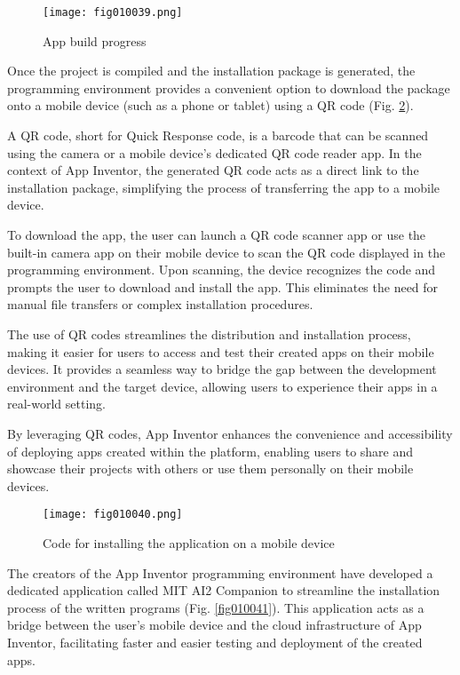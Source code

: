 \begin{figure}[H]
   \centering
   \texttt{[image: fig010039.png]}
   \caption{App build progress}
\label{fig010039}
\end{figure}

Once the project is compiled and the installation package is generated, the programming environment provides a convenient option to download the package onto a mobile device (such as a phone or tablet) using a QR code (Fig. \ref{fig010040}).

A QR code, short for Quick Response code, is a barcode that can be scanned using the camera or a mobile device's dedicated QR code reader app. In the context of App Inventor, the generated QR code acts as a direct link to the installation package, simplifying the process of transferring the app to a mobile device.

To download the app, the user can launch a QR code scanner app or use the built-in camera app on their mobile device to scan the QR code displayed in the programming environment. Upon scanning, the device recognizes the code and prompts the user to download and install the app. This eliminates the need for manual file transfers or complex installation procedures.

The use of QR codes streamlines the distribution and installation process, making it easier for users to access and test their created apps on their mobile devices. It provides a seamless way to bridge the gap between the development environment and the target device, allowing users to experience their apps in a real-world setting.

By leveraging QR codes, App Inventor enhances the convenience and accessibility of deploying apps created within the platform, enabling users to share and showcase their projects with others or use them personally on their mobile devices.

\begin{figure}[H]
   \centering
   \texttt{[image: fig010040.png]}
   \caption{Code for installing the application on a mobile device}
\label{fig010040}
\end{figure}

The creators of the App Inventor programming environment have developed a dedicated application called MIT AI2 Companion to streamline the installation process of the written programs (Fig. \ref{fig010041}). This application acts as a bridge between the user's mobile device and the cloud infrastructure of App Inventor, facilitating faster and easier testing and deployment of the created apps.

